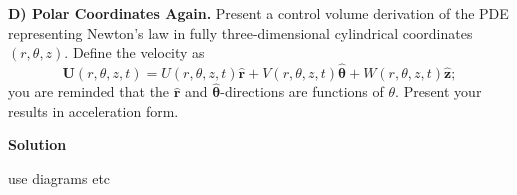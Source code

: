 \documentclass{article}
\def\*#1{\mathbf{#1}}
\newcommand{\rhat}{\mathbf{\hat{r}}}
\newcommand{\thetahat}{\mathbf{\hat{\theta}}}
\newcommand{\zhat}{\mathbf{\hat{z}}}
\begin{document}
\newpage

\textbf{D) Polar Coordinates Again.} Present a control volume derivation
of the PDE representing Newton's law in fully three-dimensional cylindrical
coordinates $(r, \theta, z)$. Define the velocity as
%
\begin{equation*}
    \*U(r, \theta, z, t)
        = U(r, \theta, z, t) \rhat
          + V(r, \theta, z, t) \thetahat
          + W(r, \theta, z, t) \zhat
          ;
\end{equation*}
%
you are reminded that the $\rhat$ and $\thetahat$-directions are
functions of $\theta$. Present your results in acceleration form.

\textbf{Solution}

use diagrams etc
\end{document}

